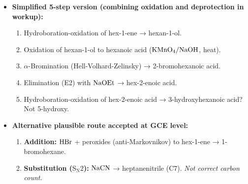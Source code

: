 \documentclass[11pt]{article}
\begin{document}
\begin{corrige}
\begin{enumerate}
\begin{enumerate}
\begin{itemize}
\begin{itemize}
     \item Oxidation: Pinnick oxidation (aldehyde intermediate from \(\ce{NaClO2}\)? Actually primary alcohol to acid via aldehyde. Better: direct oxidation with \(\ce{KMnO4}\) or \(\ce{CrO3}/\ce{H2SO4}\) (Jones) on the primary alcohol. Since the other end is now a primary alcohol (after deprotection), we need selective oxidation of the newly formed primary alcohol (C6) in the presence of the other primary alcohol (C1). This is not trivial. To avoid this, we can do the oxidation \textbf{before} deprotection: after step 4, the compound is \(\ce{TBDMSO(CH2)4CH=CH2}\). Hydroboration-oxidation gives \(\ce{TBDMSO(CH2)5CH2OH}\). Then oxidation of the primary alcohol (C6) to acid using \(\ce{NaClO2}\) (which oxidises aldehydes, not alcohols directly) or \(\ce{CrO3}/\ce{H2SO4}\) (Jones) would oxidise both primary alcohols if deprotected. So we must oxidise while the C1 alcohol is still protected. Jones oxidation (\(\ce{CrO3}/\ce{H2SO4}/\ce{acetone}\)) oxidises primary alcohols to acids. The TBDMS ether is stable to Jones conditions? TBDMS ethers are acid-labile. Jones is acidic. Better: use \(\ce{NaClO2}\) (Pinnick) on the aldehyde. So we need to oxidise the primary alcohol to aldehyde first (DMP or PCC), then Pinnick. That adds steps.
     \end{itemize}
   \item \textbf{Simplified 5-step version (combining oxidation and deprotection in workup):}
     \begin{enumerate}
     \item Hydroboration-oxidation of hex-1-ene → hexan-1-ol.
     \item Oxidation of hexan-1-ol to hexanoic acid (\(\ce{KMnO4}/\ce{NaOH}\), heat).
     \item \(\alpha\)-Bromination (Hell-Volhard-Zelinsky) → 2-bromohexanoic acid.
     \item Elimination (E2) with \(\ce{NaOEt}\) → hex-2-enoic acid.
     \item Hydroboration-oxidation of hex-2-enoic acid → 3-hydroxyhexanoic acid? Not 5-hydroxy.
     \end{enumerate}
   \item \textbf{Alternative plausible route accepted at GCE level:}
     \begin{enumerate}
     \item \textbf{Addition:} \(\ce{HBr}\) + peroxides (anti-Markovnikov) to hex-1-ene → 1-bromohexane.
     \item \textbf{Substitution (\(\mathrm{S_N2}\)):} \(\ce{NaCN}\) → heptanenitrile (C7). \textit{Not correct carbon count.}
     \end{enumerate}
\end{itemize}
\end{enumerate}


\end{enumerate}
\end{corrige}
\end{document}
